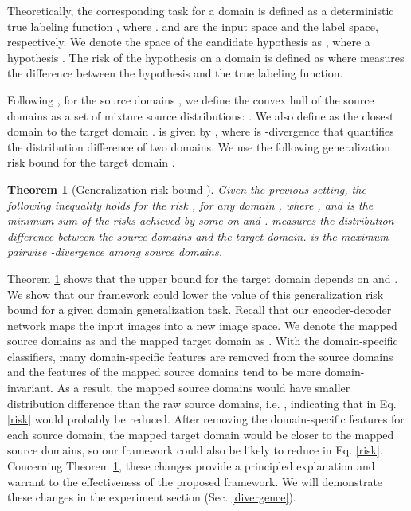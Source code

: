 \documentclass{article}
\newtheorem{theorem}{Theorem}
\begin{document}
Theoretically, the corresponding task for a domain is defined as a deterministic true labeling function , where .  and  are the input space and the label space, respectively.
We denote the space of the candidate hypothesis as , where a hypothesis . The risk of the hypothesis  on a domain  is defined as where  measures the difference between the hypothesis and the true labeling function.

Following \cite{albuquerque2019generalizing}, for the source domains , we define the convex hull  of the source domains as a set of mixture source distributions: . We also define  as the closest domain to the target domain .  is given by , where  is -divergence \cite{kifer2004detecting} that quantifies the distribution difference of two domains.
We use the following generalization risk bound \cite{albuquerque2019generalizing} for the target domain .

\begin{theorem}[Generalization risk bound \cite{albuquerque2019generalizing}] 
\label{theorem}
Given the previous setting, the following inequality holds for the risk ,  for any domain , where ,   and  is the minimum sum of the risks achieved by some  on  and .  measures the distribution difference between the source domains and the target domain.  is the maximum pairwise -divergence among source domains.
\end{theorem}

Theorem \ref{theorem} shows that the upper bound for the target domain depends on  and .
We show that our framework could lower the value of this generalization risk bound for a given domain generalization task. Recall that our encoder-decoder network maps the input images into a new image space. We denote the mapped source domains as  and the mapped target domain as . With the domain-specific classifiers, many domain-specific features are removed from the source domains and the features of the mapped source domains tend to be more domain-invariant. As a result, the mapped source domains  would have smaller distribution difference than the raw source domains, i.e. , indicating that  in Eq. \ref{risk} would probably be reduced. After removing the domain-specific features for each source domain, the mapped target domain  would be closer to the mapped source domains, so our framework could also be likely to reduce  in Eq. \ref{risk}. Concerning Theorem \ref{theorem}, these changes provide a principled explanation and warrant to the effectiveness of the proposed framework. We will demonstrate these changes in the experiment section (Sec. \ref{divergence}). 
\end{document}
